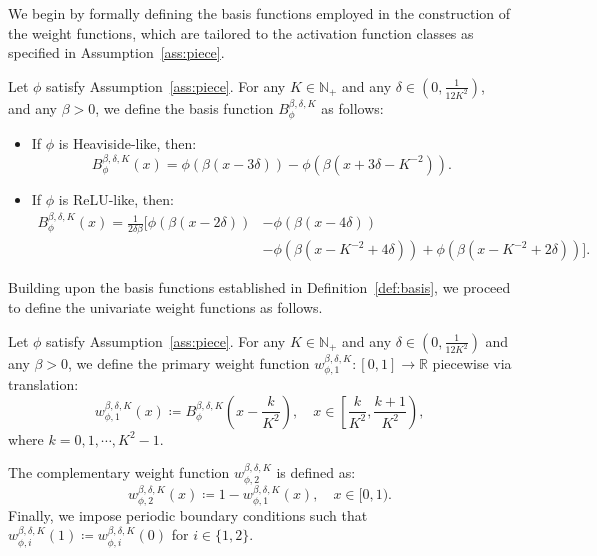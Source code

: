 \documentclass[11pt]{article}
\begin{document}
We begin by formally defining the basis functions employed in the construction of the weight functions, which are tailored to the activation function classes as specified in Assumption~\ref{ass:piece}.
\begin{definition}
    Let $\phi$ satisfy Assumption~\ref{ass:piece}. For any $K \in \mathbb{N}_{+}$ and any $\delta \in \left(0, \frac{1}{12K^2} \right)$, and any $\beta > 0$, we define the basis function $B_{\phi}^{\beta, \delta,K}$ as follows:
    \begin{itemize}
        \item If $\phi$ is Heaviside-like, then:
        \begin{equation*}
            B_{\phi}^{\beta, \delta, K}(x) = \phi \left( \beta ( x - 3 \delta) \right) - \phi \left( \beta (x + 3 \delta - K^{-2})\right).
        \end{equation*}
        \item If $\phi$ is ReLU-like, then:
        \begin{equation*}
            \begin{aligned}
                B_{\phi}^{\beta, \delta, K}(x) = \frac{1}{2\delta \beta} \Big[ \phi\left( \beta(x - 2 \delta) \right) &- \phi \left( \beta(x - 4\delta)\right) \\ 
                &- \phi \left(\beta(x - K^{-2}+4\delta) \right) +  \phi \left(\beta(x - K^{-2}+2\delta) \right)\Big].
            \end{aligned}
        \end{equation*}
    \end{itemize}
    \label{def:basis}
\end{definition}
Building upon the basis functions established in Definition~\ref{def:basis}, we proceed to define the univariate weight functions as follows.
\begin{definition}
     Let $\phi$ satisfy Assumption~\ref{ass:piece}. For any $K \in \mathbb{N}_{+}$ and any $\delta \in \left(0, \frac{1}{12 K^2 }\right) $ and any $\beta>0$, we define the primary weight function $w^{\beta, \delta, K}_{\phi,1}: [0,1] \to \mathbb{R}$  piecewise via translation:
    \begin{equation}
        w^{\beta, \delta, K}_{\phi,1}(x) \coloneqq B_{\phi}^{\beta, \delta, K}\left( x - \frac{k}{K^2}\right), \quad  x \in \left[ \frac{k}{K^2}, \frac{k+1}{K^2}\right),
        \label{eq:w_1}
    \end{equation}
    where $k = 0, 1, \cdots, K^{2}-1$.


    The complementary weight function $w^{\beta, \delta, K}_{\phi, 2}$ is defined as:
   \begin{equation*}
        w^{\beta, \delta, K}_{\phi, 2} (x) \coloneqq 1 - w^{\beta, \delta, K}_{\phi,1}(x), \quad  x \in [0,1).
        \label{eq:w_2}
    \end{equation*}
    Finally, we impose periodic boundary conditions such that $w^{\beta, \delta, K}_{\phi,i}(1) \coloneqq w_{\phi,i}^{\beta, \delta, K}(0)$ for $i \in \{1,2\}$.
    \label{def:univariate_weight}
\end{definition}
\end{document}
